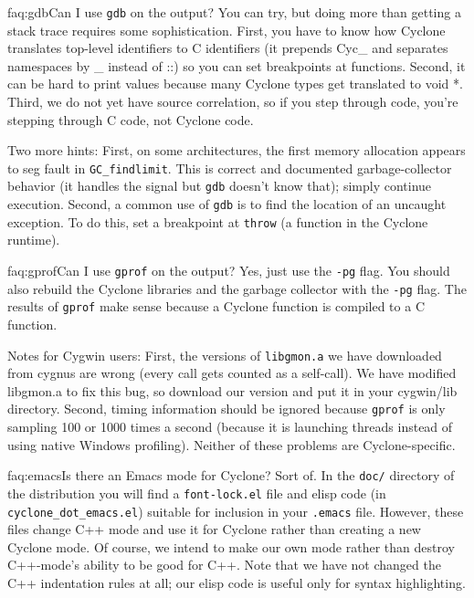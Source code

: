 \begin{faqa}{faq:gdb}{Can I use \texttt{gdb} on the output?}
You can try, but doing more than getting a stack trace requires some
sophistication.  First, you have to know how Cyclone translates
top-level identifiers to C identifiers (it prepends Cyc_ and separates
namespaces by _ instead of ::) so you can set breakpoints at
functions.  Second, it can be hard to print values because many
Cyclone types get translated to void *.  Third, we do not yet have
source correlation, so if you step through code, you're stepping
through C code, not Cyclone code.

Two more hints: First, on some architectures, the first memory
allocation appears to seg fault in \texttt{GC_findlimit}.  This is
correct and documented garbage-collector behavior (it handles the
signal but \texttt{gdb} doesn't know that); simply continue execution.
Second, a common use of \texttt{gdb} is to find the location of an
uncaught exception.  To do this, set a breakpoint at \texttt{throw} (a
function in the Cyclone runtime).
\end{faqa}

\begin{faqa}{faq:gprof}{Can I use \texttt{gprof} on the output?}
Yes, just use the \texttt{-pg} flag.  You should also rebuild the
Cyclone libraries and the garbage collector with the \texttt{-pg}
flag.  The results of \texttt{gprof} make sense because a Cyclone
function is compiled to a C function.

Notes for Cygwin users: First, the versions of \texttt{libgmon.a} we
have downloaded from cygnus are wrong (every call gets counted as a
self-call).  We have modified libgmon.a to fix this bug, so download
our version and put it in your cygwin/lib directory.  Second, timing
information should be ignored because \texttt{gprof} is only sampling
100 or 1000 times a second (because it is launching threads instead of
using native Windows profiling).  Neither of these problems are
Cyclone-specific.
\end{faqa}

\begin{faqa}{faq:emacs}{Is there an Emacs mode for Cyclone?}
Sort of.  In the \texttt{doc/} directory of the distribution you will
find a \texttt{font-lock.el} file and elisp code (in
\texttt{cyclone_dot_emacs.el}) suitable for inclusion in your
\texttt{.emacs} file.  However, these files change C++ mode and use it
for Cyclone rather than creating a new Cyclone mode.  Of course, we
intend to make our own mode rather than destroy C++-mode's ability to
be good for C++.  Note that we have not changed the C++ indentation
rules at all; our elisp code is useful only for syntax highlighting.
\end{faqa}

